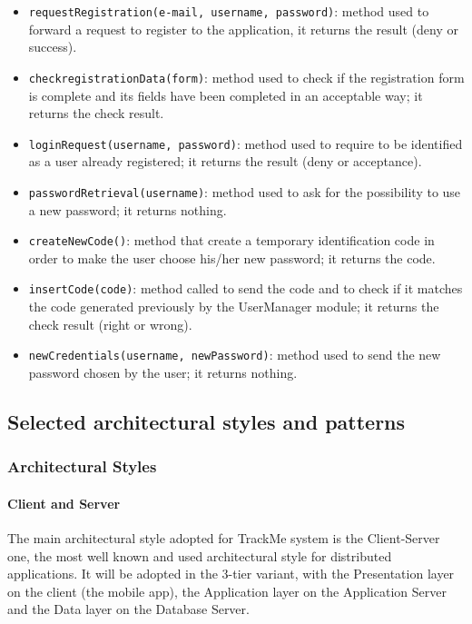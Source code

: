 \begin{itemize}
\item[ ]\texttt{requestRegistration(e-mail, username, password)}: method used to forward a request to register to the application, it returns the result (deny or success).

\item[ ]\texttt{checkregistrationData(form)}: method used to check if the registration form is complete and its fields have been completed in an acceptable way; it returns the check result.

\item[ ]\texttt{loginRequest(username, password)}: method used to require to be identified as a user already registered; it returns the result (deny or acceptance).

\item[ ]\texttt{passwordRetrieval(username)}: method used to ask for the possibility to use a new password; it returns nothing.

\item[ ]\texttt{createNewCode()}: method that create a temporary identification code in order to make the user choose his/her new password; it returns the code.

\item[ ]\texttt{insertCode(code)}: method called to send the code and to check if it matches the code generated previously by the UserManager module; it returns the check result (right or wrong).

\item[ ]\texttt{newCredentials(username, newPassword)}: method used to send the new password chosen by the user; it returns nothing.
\end{itemize}

\subsection{Selected architectural styles and patterns}
\subsubsection{Architectural Styles}
\paragraph*{Client and Server}
The main architectural style adopted for TrackMe system is the Client-Server one, the most well known and used architectural style for distributed applications. It will be adopted in the 3-tier variant, with the Presentation layer on the client (the mobile app), the Application layer on the Application Server and the Data layer on the Database Server.

